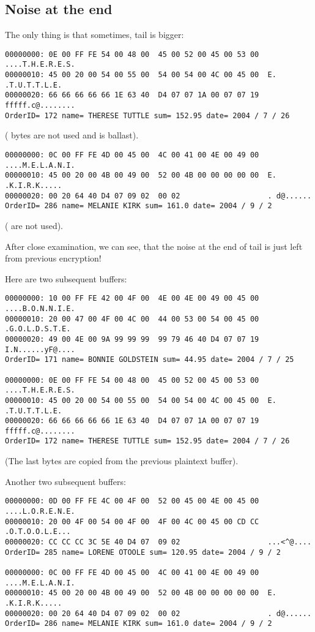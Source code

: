 \subsection{Noise at the end}

The only thing is that sometimes, tail is bigger:

\begin{lstlisting}
00000000: 0E 00 FF FE 54 00 48 00  45 00 52 00 45 00 53 00  ....T.H.E.R.E.S.
00000010: 45 00 20 00 54 00 55 00  54 00 54 00 4C 00 45 00  E. .T.U.T.T.L.E.
00000020: 66 66 66 66 66 1E 63 40  D4 07 07 1A 00 07 07 19  fffff.c@........
OrderID= 172 name= THERESE TUTTLE sum= 152.95 date= 2004 / 7 / 26
\end{lstlisting}

( bytes are not used and is ballast).

\begin{lstlisting}
00000000: 0C 00 FF FE 4D 00 45 00  4C 00 41 00 4E 00 49 00  ....M.E.L.A.N.I.
00000010: 45 00 20 00 4B 00 49 00  52 00 4B 00 00 00 00 00  E. .K.I.R.K.....
00000020: 00 20 64 40 D4 07 09 02  00 02                    . d@......
OrderID= 286 name= MELANIE KIRK sum= 161.0 date= 2004 / 9 / 2
\end{lstlisting}

( are not used).

After close examination, we can see, that the noise at the end of tail is just left
from previous encryption!

Here are two subsequent buffers:

\begin{lstlisting}
00000000: 10 00 FF FE 42 00 4F 00  4E 00 4E 00 49 00 45 00  ....B.O.N.N.I.E.
00000010: 20 00 47 00 4F 00 4C 00  44 00 53 00 54 00 45 00   .G.O.L.D.S.T.E.
00000020: 49 00 4E 00 9A 99 99 99  99 79 46 40 D4 07 07 19  I.N......yF@....
OrderID= 171 name= BONNIE GOLDSTEIN sum= 44.95 date= 2004 / 7 / 25

00000000: 0E 00 FF FE 54 00 48 00  45 00 52 00 45 00 53 00  ....T.H.E.R.E.S.
00000010: 45 00 20 00 54 00 55 00  54 00 54 00 4C 00 45 00  E. .T.U.T.T.L.E.
00000020: 66 66 66 66 66 1E 63 40  D4 07 07 1A 00 07 07 19  fffff.c@........
OrderID= 172 name= THERESE TUTTLE sum= 152.95 date= 2004 / 7 / 26
\end{lstlisting}

(The last  bytes are copied from the previous plaintext buffer).

Another two subsequent buffers:

\begin{lstlisting}
00000000: 0D 00 FF FE 4C 00 4F 00  52 00 45 00 4E 00 45 00  ....L.O.R.E.N.E.
00000010: 20 00 4F 00 54 00 4F 00  4F 00 4C 00 45 00 CD CC   .O.T.O.O.L.E...
00000020: CC CC CC 3C 5E 40 D4 07  09 02                    ...<^@....
OrderID= 285 name= LORENE OTOOLE sum= 120.95 date= 2004 / 9 / 2

00000000: 0C 00 FF FE 4D 00 45 00  4C 00 41 00 4E 00 49 00  ....M.E.L.A.N.I.
00000010: 45 00 20 00 4B 00 49 00  52 00 4B 00 00 00 00 00  E. .K.I.R.K.....
00000020: 00 20 64 40 D4 07 09 02  00 02                    . d@......
OrderID= 286 name= MELANIE KIRK sum= 161.0 date= 2004 / 9 / 2
\end{lstlisting}

